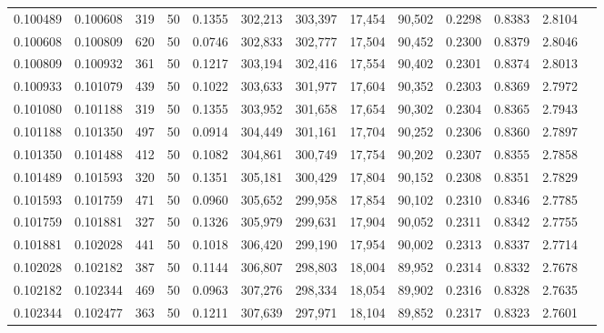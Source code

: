 \begin{tabular}{rrrrrrrrrrrrr}
0.100489 & 0.100608 &   319 &  50 &                                     0.1355 & 302,213 & 303,397 &  17,454 &  90,502 & 0.2298 & 0.8383 & 2.8104 \\
0.100608 & 0.100809 &   620 &  50 &                                     0.0746 & 302,833 & 302,777 &  17,504 &  90,452 & 0.2300 & 0.8379 & 2.8046 \\
0.100809 & 0.100932 &   361 &  50 &                                     0.1217 & 303,194 & 302,416 &  17,554 &  90,402 & 0.2301 & 0.8374 & 2.8013 \\
0.100933 & 0.101079 &   439 &  50 &                                     0.1022 & 303,633 & 301,977 &  17,604 &  90,352 & 0.2303 & 0.8369 & 2.7972 \\
0.101080 & 0.101188 &   319 &  50 &                                     0.1355 & 303,952 & 301,658 &  17,654 &  90,302 & 0.2304 & 0.8365 & 2.7943 \\
0.101188 & 0.101350 &   497 &  50 &                                     0.0914 & 304,449 & 301,161 &  17,704 &  90,252 & 0.2306 & 0.8360 & 2.7897 \\
0.101350 & 0.101488 &   412 &  50 &                                     0.1082 & 304,861 & 300,749 &  17,754 &  90,202 & 0.2307 & 0.8355 & 2.7858 \\
0.101489 & 0.101593 &   320 &  50 &                                     0.1351 & 305,181 & 300,429 &  17,804 &  90,152 & 0.2308 & 0.8351 & 2.7829 \\
0.101593 & 0.101759 &   471 &  50 &                                     0.0960 & 305,652 & 299,958 &  17,854 &  90,102 & 0.2310 & 0.8346 & 2.7785 \\
0.101759 & 0.101881 &   327 &  50 &                                     0.1326 & 305,979 & 299,631 &  17,904 &  90,052 & 0.2311 & 0.8342 & 2.7755 \\
0.101881 & 0.102028 &   441 &  50 &                                     0.1018 & 306,420 & 299,190 &  17,954 &  90,002 & 0.2313 & 0.8337 & 2.7714 \\
0.102028 & 0.102182 &   387 &  50 &                                     0.1144 & 306,807 & 298,803 &  18,004 &  89,952 & 0.2314 & 0.8332 & 2.7678 \\
0.102182 & 0.102344 &   469 &  50 &                                     0.0963 & 307,276 & 298,334 &  18,054 &  89,902 & 0.2316 & 0.8328 & 2.7635 \\
0.102344 & 0.102477 &   363 &  50 &                                     0.1211 & 307,639 & 297,971 &  18,104 &  89,852 & 0.2317 & 0.8323 & 2.7601 \\

\end{tabular}
